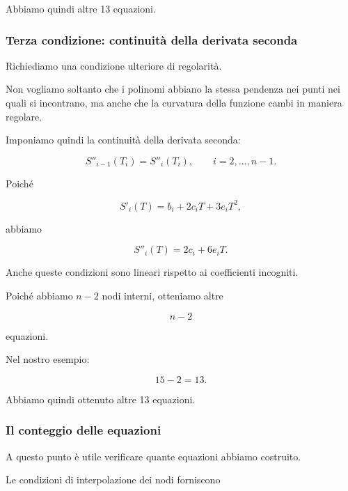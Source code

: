 Abbiamo quindi altre 13 equazioni.


\subsubsection{Terza condizione: continuità della derivata seconda}

Richiediamo una condizione ulteriore di regolarità.

Non vogliamo soltanto che i polinomi abbiano la stessa pendenza nei
punti nei quali si incontrano, ma anche che la curvatura della
funzione cambi in maniera regolare.

Imponiamo quindi la continuità della derivata seconda:

\begin{equation*}
    S''_{i-1}(T_i)=S''_i(T_i),
    \qquad i=2,\ldots,n-1.
    \label{eq:spline-second-derivative}
\end{equation*}

Poiché

\begin{equation*}
    S'_i(T)=b_i+2c_iT+3e_iT^2,
\end{equation*}

abbiamo

\begin{equation*}
    S''_i(T)=2c_i+6e_iT.
\end{equation*}

Anche queste condizioni sono lineari rispetto ai coefficienti
incogniti.

Poiché abbiamo $n-2$ nodi interni, otteniamo altre

\begin{equation*}
    n-2
\end{equation*}

equazioni.

Nel nostro esempio:

\begin{equation*}
    15-2=13.
\end{equation*}

Abbiamo quindi ottenuto altre 13 equazioni.


\subsubsection{Il conteggio delle equazioni}

A questo punto è utile verificare quante equazioni abbiamo costruito.

Le condizioni di interpolazione dei nodi forniscono

